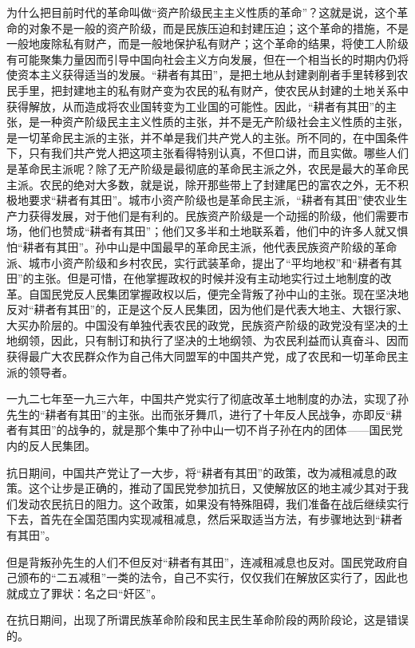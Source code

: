 为什么把目前时代的革命叫做“资产阶级民主主义性质的革命”？这就是说，这个革命的对象不是一般的资产阶级，而是民族压迫和封建压迫；这个革命的措施，不是一般地废除私有财产，而是一般地保护私有财产；这个革命的结果，将使工人阶级有可能聚集力量因而引导中国向社会主义方向发展，但在一个相当长的时期内仍将使资本主义获得适当的发展。“耕者有其田”，是把土地从封建剥削者手里转移到农民手里，把封建地主的私有财产变为农民的私有财产，使农民从封建的土地关系中获得解放，从而造成将农业国转变为工业国的可能性。因此，“耕者有其田”的主张，是一种资产阶级民主主义性质的主张，并不是无产阶级社会主义性质的主张，是一切革命民主派的主张，并不单是我们共产党人的主张。所不同的，在中国条件下，只有我们共产党人把这项主张看得特别认真，不但口讲，而且实做。哪些人们是革命民主派呢？除了无产阶级是最彻底的革命民主派之外，农民是最大的革命民主派。农民的绝对大多数，就是说，除开那些带上了封建尾巴的富农之外，无不积极地要求“耕者有其田”。城市小资产阶级也是革命民主派，“耕者有其田”使农业生产力获得发展，对于他们是有利的。民族资产阶级是一个动摇的阶级，他们需要市场，他们也赞成“耕者有其田”；他们又多半和土地联系着，他们中的许多人就又惧怕“耕者有其田”。孙中山是中国最早的革命民主派，他代表民族资产阶级的革命派、城市小资产阶级和乡村农民，实行武装革命，提出了“平均地权”和“耕者有其田”的主张。但是可惜，在他掌握政权的时候并没有主动地实行过土地制度的改革。自国民党反人民集团掌握政权以后，便完全背叛了孙中山的主张。现在坚决地反对“耕者有其田”的，正是这个反人民集团，因为他们是代表大地主、大银行家、大买办阶层的。中国没有单独代表农民的政党，民族资产阶级的政党没有坚决的土地纲领，因此，只有制订和执行了坚决的土地纲领、为农民利益而认真奋斗、因而获得最广大农民群众作为自己伟大同盟军的中国共产党，成了农民和一切革命民主派的领导者。

一九二七年至一九三六年，中国共产党实行了彻底改革土地制度的办法，实现了孙先生的“耕者有其田”的主张。出而张牙舞爪，进行了十年反人民战争，亦即反“耕者有其田”的战争的，就是那个集中了孙中山一切不肖子孙在内的团体——国民党内的反人民集团。

抗日期间，中国共产党让了一大步，将“耕者有其田”的政策，改为减租减息的政策。这个让步是正确的，推动了国民党参加抗日，又使解放区的地主减少其对于我们发动农民抗日的阻力。这个政策，如果没有特殊阻碍，我们准备在战后继续实行下去，首先在全国范围内实现减租减息，然后采取适当方法，有步骤地达到“耕者有其田”。

但是背叛孙先生的人们不但反对“耕者有其田”，连减租减息也反对。国民党政府自己颁布的“二五减租”一类的法令，自己不实行，仅仅我们在解放区实行了，因此也就成立了罪状：名之曰“奸区”。

在抗日期间，出现了所谓民族革命阶段和民主民生革命阶段的两阶段论，这是错误的。

